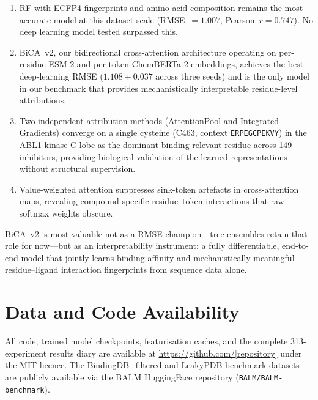 \documentclass[11pt,twocolumn]{article}
\begin{document}
\begin{enumerate}
  \item RF with ECFP4 fingerprints and amino-acid composition remains the
    most accurate model at this dataset scale (RMSE~$=1.007$,
    Pearson~$r=0.747$).  No deep learning model tested surpassed this.

  \item BiCA~v2, our bidirectional cross-attention architecture operating on
    per-residue ESM-2 and per-token ChemBERTa-2 embeddings, achieves the
    best deep-learning RMSE ($1.108 \pm 0.037$ across three seeds) and is
    the only model in our benchmark that provides mechanistically
    interpretable residue-level attributions.

  \item Two independent attribution methods (AttentionPool and Integrated
    Gradients) converge on a single cysteine (C463, context
    \texttt{ERPEGCPEKVY}) in the ABL1 kinase C-lobe as the dominant
    binding-relevant residue across 149 inhibitors, providing biological
    validation of the learned representations without structural supervision.

  \item Value-weighted attention suppresses sink-token artefacts in
    cross-attention maps, revealing compound-specific residue--token
    interactions that raw softmax weights obscure.
\end{enumerate}

BiCA~v2 is most valuable not as a RMSE champion---tree ensembles retain that
role for now---but as an interpretability instrument: a fully differentiable,
end-to-end model that jointly learns binding affinity and mechanistically
meaningful residue--ligand interaction fingerprints from sequence data alone.

\section*{Data and Code Availability}

All code, trained model checkpoints, featurisation caches, and the complete
313-experiment results diary are available at
\url{https://github.com/[repository]} under the MIT licence.
The BindingDB\_filtered and LeakyPDB benchmark datasets are publicly
available via the BALM HuggingFace repository
(\texttt{BALM/BALM-benchmark}).
\end{document}

